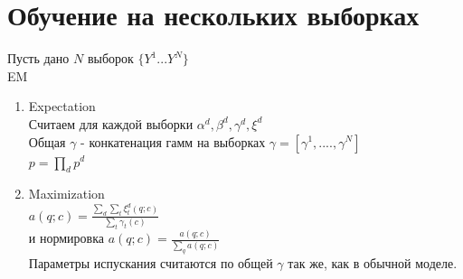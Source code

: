\documentclass[10pt,a4paper]{article}
\begin{document}
\section{Обучение на нескольких выборках}
Пусть дано $ N $ выборок $ \{Y^{1} ... Y^{N}\}$
\\
EM
\begin{enumerate}
\item Expectation
\\
Считаем для каждой выборки  $\alpha^{d}, \beta^{d}, \gamma^{d}, \xi^{d}$
\\
Общая $\gamma$ - конкатенация гамм на выборках
$ \gamma = [\gamma^{1}, .... ,\gamma^{N}] $
\\
$ p = \prod_{d}{p^{d}}$
\item Maximization
\\
$ a(q;c) = \frac{\sum_{d}{\sum_{t}{\xi^{d}_{t}(q;c)}}}{\sum_{t}{\gamma_{t}(c)}} $
\\
и нормировка
$ a(q;c) = \frac{a(q;c)}{\sum_{q}{a(q;c)}} $
\\
Параметры испускания считаются по общей $ \gamma $ так же, как в обычной моделе.
\end{enumerate}
\end{document}
